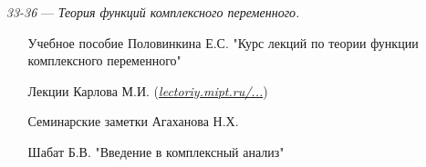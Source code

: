 \begin{itemize}
\item[\textit{33-36}]
\; --- \: \textit{Теория функций комплексного переменного.}
\begin{itemize}
\item[\textbullet]
Учебное пособие Половинкина Е.С. "Курс лекций по теории функции комплексного переменного"
\item[\textbullet] 
Лекции Карлова М.И. (\href{http://lectoriy.mipt.ru/course/Maths-ComplexAnalysis-13L}{\textit{lectoriy.mipt.ru/...}})
\item[\textbullet] 
Семинарские заметки Агаханова Н.Х.
\item[\textbullet] 
Шабат Б.В. "Введение в комплексный анализ"
\end{itemize}
\end{itemize}
